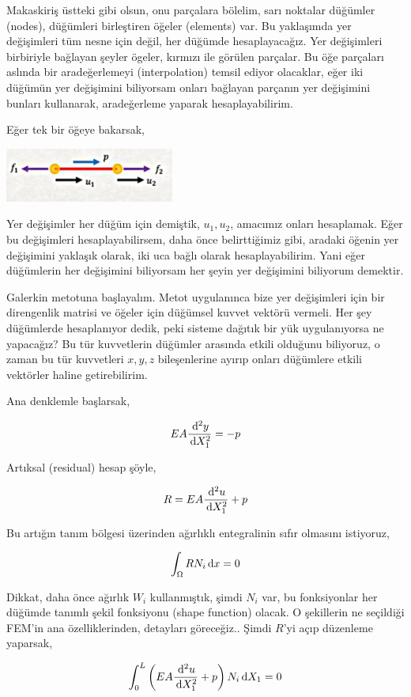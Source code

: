 \documentclass[12pt,fleqn]{article}\usepackage{../../common}
\begin{document}
Makaskiriş üstteki gibi olsun, onu parçalara bölelim, sarı noktalar düğümler
(nodes), düğümleri birleştiren öğeler (elements) var. Bu yaklaşımda yer
değişimleri tüm nesne için değil, her düğümde hesaplayacağız. Yer değişimleri
birbiriyle bağlayan şeyler ögeler, kırmızı ile görülen parçalar.  Bu öğe
parçaları aslında bir aradeğerlemeyi (interpolation) temsil ediyor olacaklar,
eğer iki düğümün yer değişimini biliyorsam onları bağlayan parçanın yer
değişimini bunları kullanarak, aradeğerleme yaparak hesaplayabilirim.

Eğer tek bir öğeye bakarsak,

\includegraphics[width=15em]{compscieng_bpp45fem2_04.jpg}

Yer değişimler her düğüm için demiştik, $u_1,u_2$, amacımız onları hesaplamak.
Eğer bu değişimleri hesaplayabilirsem, daha önce belirttiğimiz gibi, aradaki
öğenin yer değişimini yaklaşık olarak, iki uca bağlı olarak hesaplayabilirim.
Yani eğer düğümlerin her değişimini biliyorsam her şeyin yer değişimini
biliyorum demektir.

Galerkin metotuna başlayalım. Metot uygulanınca bize yer değişimleri için bir
direngenlik matrisi ve öğeler için düğümsel kuvvet vektörü vermeli. Her şey
düğümlerde hesaplanıyor dedik, peki sisteme dağıtık bir yük uygulanıyorsa
ne yapacağız? Bu tür kuvvetlerin düğümler arasında etkili olduğunu biliyoruz,
o zaman bu tür kuvvetleri $x,y,z$ bileşenlerine ayırıp onları düğümlere etkili
vektörler haline getirebilirim.

Ana denklemle başlarsak,

$$
E A \frac{\,\mathrm{d}^2 y}{\,\mathrm{d} X_1^2} = -p
$$

Artıksal (residual) hesap şöyle,

$$
R = EA \frac{\,\mathrm{d}^2 u}{\,\mathrm{d} X_1^2} + p
$$

Bu artığın tanım bölgesi üzerinden ağırlıklı entegralinin sıfır olmasını
istiyoruz,

$$
\int_\Omega R N_i \,\mathrm{d} x = 0 
$$

Dikkat, daha önce ağırlık $W_i$ kullanmıştık, şimdi $N_i$ var, bu fonksiyonlar
her düğümde tanımlı şekil fonksiyonu (shape function) olacak. O şekillerin ne
seçildiği FEM'in ana özelliklerinden, detayları göreceğiz.. Şimdi $R$'yi açıp
düzenleme yaparsak,

$$
\int_{0}^{L} \left( EA \frac{\,\mathrm{d}^2 u}{\,\mathrm{d} X_1^2} + p  \right) N_i \,\mathrm{d} X_1 = 0 
$$
\end{document}
